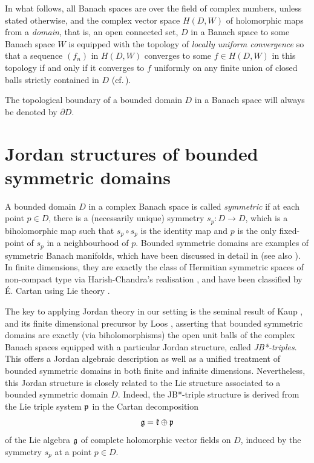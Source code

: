 \documentclass[12pt, twoside]{article}
\theoremstyle{definition}
\numberwithin{equation}{section}
\begin{document}
In what follows, all Banach spaces are over the field of complex numbers, unless stated otherwise,
and the complex vector space $H(D, W)$ of holomorphic maps
from a {\it domain}, that is, an open connected set, $D$ in a Banach space
to some Banach space $W$ is equipped with the topology of {\it  locally uniform
convergence} so that a sequence $(f_n)$ in  $H(D, W)$ converges to some $f \in H(D,W)$ in this topology
if and only if it converges to $f$
uniformly on any finite union of closed balls strictly contained in $D$ (cf.\,\cite[1.1]{book2}).

The topological boundary of a bounded domain $D$ in a Banach space will always be denoted by
$\partial D$.

\section{Jordan structures of bounded symmetric domains}

A bounded domain $D$ in a complex Banach space is called {\it symmetric} if at each point $p\in D$,
there is a (necessarily unique) symmetry $s_p : D \longrightarrow D$, which is a biholomorphic map
such that $s_p \circ s_p$ is the identity map and $p$ is the only fixed-point of $s_p$ in a neighbourhood of $p$.
Bounded symmetric domains are examples of symmetric Banach manifolds, which have been
discussed in detail in \cite{u} (see also \cite{book2}).
In finite dimensions,  they are exactly  the class of Hermitian symmetric spaces
of non-compact type via  Harish-Chandra's realisation \cite{har}, and have been classified by \'E. Cartan using Lie theory
\cite{cartan}.

The key to applying Jordan theory in our setting is the seminal result of Kaup \cite{k}, and its finite dimensional
precursor by Loos \cite{LOOS}, asserting that
bounded symmetric domains are exactly (via biholomorphisms) the open unit balls of the complex Banach spaces
equipped with a particular Jordan structure, called {\it JB*-triples}. This offers a Jordan algebraic description as well as
a unified treatment of bounded symmetric domains in both  finite and infinite dimensions. Nevertheless, this Jordan
structure is closely related to the Lie structure associated to a bounded symmetric domain $D$. Indeed, the JB*-triple
structure is derived from the Lie triple system $\frak p$ in the Cartan decomposition
\begin{equation}\label{rank}
\frak g = \frak k \oplus \frak p
\end{equation}
of the Lie algebra $\frak g $ of complete holomorphic vector fields on $D$, induced by the symmetry $s_p$ at a point
$p\in D$.
\end{document}
